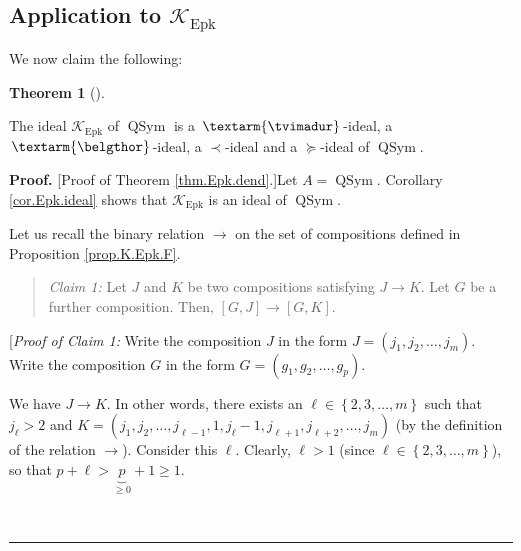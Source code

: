 \documentclass[numbers=enddot,12pt,final,onecolumn,notitlepage]{scrartcl}%
\theoremstyle{definition}
\newtheorem{theo}{Theorem}[section]
\newenvironment{theorem}[1][]
{\begin{theo}[#1]\begin{leftbar}}
{\end{leftbar}\end{theo}}
\newenvironment{statement}{\begin{quote}}{\end{quote}}
\newenvironment{proof}[1][Proof]{\noindent\textbf{#1.} }{\ \rule{0.5em}{0.5em}}
\newenvironment{verlong}{}{}
\newcommand{\tvi}{\left. \textarm{\tvimadur} \right.}
\newcommand{\bel}{\left. \textarm{\belgthor} \right.}
\begin{document}
\begin{verlong}
\subsection{Application to $\mathcal{K}_{\operatorname*{Epk}}$}

We now claim the following:

\begin{theorem}
\label{thm.Epk.dend}The ideal $\mathcal{K}_{\operatorname*{Epk}}$ of
$\operatorname*{QSym}$ is a $\tvi  $-ideal, a $\bel  $-ideal, a $\left.
\prec\right.  $-ideal and a $\left.  \succeq\right.  $-ideal of
$\operatorname*{QSym}$.
\end{theorem}

\begin{proof}
[Proof of Theorem \ref{thm.Epk.dend}.]Let $A=\operatorname*{QSym}$. Corollary
\ref{cor.Epk.ideal} shows that $\mathcal{K}_{\operatorname*{Epk}}$ is an ideal
of $\operatorname*{QSym}$.

Let us recall the binary relation $\rightarrow$ on the set of compositions
defined in Proposition \ref{prop.K.Epk.F}.

\begin{statement}
\textit{Claim 1:} Let $J$ and $K$ be two compositions satisfying $J\rightarrow
K$. Let $G$ be a further composition. Then, $\left[  G,J\right]
\rightarrow\left[  G,K\right]  $.
\end{statement}

[\textit{Proof of Claim 1:} Write the composition $J$ in the form $J=\left(
j_{1},j_{2},\ldots,j_{m}\right)  $. Write the composition $G$ in the form
$G=\left(  g_{1},g_{2},\ldots,g_{p}\right)  $.

We have $J\rightarrow K$. In other words, there exists an $\ell\in\left\{
2,3,\ldots,m\right\}  $ such that $j_{\ell}>2$ and $K=\left(  j_{1}%
,j_{2},\ldots,j_{\ell-1},1,j_{\ell}-1,j_{\ell+1},j_{\ell+2},\ldots
,j_{m}\right)  $ (by the definition of the relation $\rightarrow$). Consider
this $\ell$. Clearly, $\ell>1$ (since $\ell\in\left\{  2,3,\ldots,m\right\}
$), so that $p+\ell>\underbrace{p}_{\geq0}+1\geq1$.


\end{proof}
\end{verlong}
\end{document}
